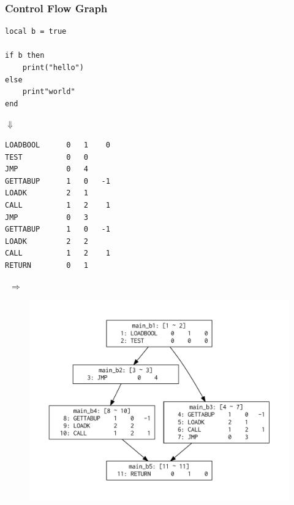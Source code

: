 \subsubsection{Control Flow Graph}
\begin{frame}[fragile]
\frametitlesubs
\begin{minipage}{.23\textwidth}
	\scriptsize
	\begin{lstlisting}[language={[5.3]lua},numbers=none]
local b = true

if b then
	print("hello")
else
	print"world"
end
\end{lstlisting}

\pause
\vspace{-2\zw}
\begin{center}
	\normalsize
\noindent$\Downarrow$
\end{center}
\vspace{-2\zw}
\begin{lstlisting}[numbers=none]
LOADBOOL      0   1    0
TEST          0   0 
JMP           0   4 
GETTABUP      1   0   -1
LOADK         2   1 
CALL          1   2    1
JMP           0   3 
GETTABUP      1   0   -1
LOADK         2   2 
CALL          1   2    1
RETURN        0   1 
\end{lstlisting}
\end{minipage}\pause
\begin{minipage}{.06\textwidth}
\begin{flushright}
	\ $\Rightarrow$
\end{flushright}
\end{minipage}
\begin{minipage}{.56\textwidth}
	\begin{figure}[h]
	\centering
	\includegraphics[width=1.3\textwidth]{img/cfg.pdf}
	\end{figure}
\end{minipage}
\end{frame}

